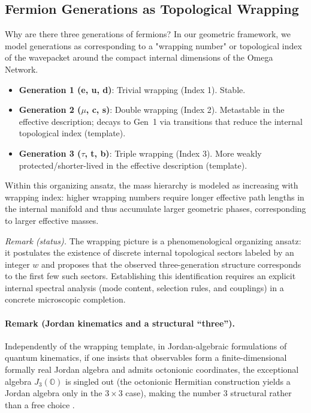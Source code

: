\subsection{Fermion Generations as Topological Wrapping}
Why are there three generations of fermions? In our geometric framework, we model generations as corresponding to a "wrapping number" or topological index of the wavepacket around the compact internal dimensions of the Omega Network.
\begin{itemize}
    \item \textbf{Generation 1 (e, u, d)}: Trivial wrapping (Index 1). Stable.
    \item \textbf{Generation 2 ($\mu$, c, s)}: Double wrapping (Index 2). Metastable in the effective description; decays to Gen~1 via transitions that reduce the internal topological index (template).
    \item \textbf{Generation 3 ($\tau$, t, b)}: Triple wrapping (Index 3). More weakly protected/shorter-lived in the effective description (template).
\end{itemize}
Within this organizing ansatz, the mass hierarchy is modeled as increasing with wrapping index: higher wrapping numbers require longer effective path lengths in the internal manifold and thus accumulate larger geometric phases, corresponding to larger effective masses.
\par
\noindent\textit{Remark (status).} The wrapping picture is a phenomenological organizing ansatz: it postulates the existence of discrete internal topological sectors labeled by an integer $w$ and proposes that the observed three-generation structure corresponds to the first few such sectors. Establishing this identification requires an explicit internal spectral analysis (mode content, selection rules, and couplings) in a concrete microscopic completion.
\paragraph{Remark (Jordan kinematics and a structural ``three'').}
Independently of the wrapping template, in Jordan-algebraic formulations of quantum kinematics, if one insists that observables form a finite-dimensional formally real Jordan algebra and admits octonionic coordinates, the exceptional algebra $J_3(\mathbb{O})$ is singled out (the octonionic Hermitian construction yields a Jordan algebra only in the $3\times 3$ case), making the number $3$ structural rather than a free choice \cite{JordanVonNeumannWigner1934,Baez2002,Ma2025HPA}.

